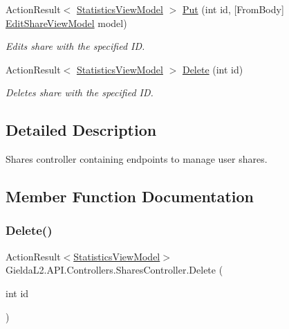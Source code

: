 \begin{DoxyCompactItemize}
Action\+Result$<$ \mbox{\hyperlink{class_gielda_l2_1_1_a_p_i_1_1_view_models_1_1_view_1_1_statistics_view_model}{Statistics\+View\+Model}} $>$ \mbox{\hyperlink{class_gielda_l2_1_1_a_p_i_1_1_controllers_1_1_shares_controller_a348aaaccd93f56ec312cd4b3e7e3d7d0}{Put}} (int id, \mbox{[}From\+Body\mbox{]} \mbox{\hyperlink{class_gielda_l2_1_1_a_p_i_1_1_view_models_1_1_edit_1_1_edit_share_view_model}{Edit\+Share\+View\+Model}} model)
\begin{DoxyCompactList}\small\item\em Edits share with the specified ID. \end{DoxyCompactList}\item 
Action\+Result$<$ \mbox{\hyperlink{class_gielda_l2_1_1_a_p_i_1_1_view_models_1_1_view_1_1_statistics_view_model}{Statistics\+View\+Model}} $>$ \mbox{\hyperlink{class_gielda_l2_1_1_a_p_i_1_1_controllers_1_1_shares_controller_ad322516136277b4893790a697442ac72}{Delete}} (int id)
\begin{DoxyCompactList}\small\item\em Deletes share with the specified ID. \end{DoxyCompactList}\end{DoxyCompactItemize}


\subsection{Detailed Description}
Shares controller containing endpoints to manage user shares. 



\subsection{Member Function Documentation}
\mbox{\label{class_gielda_l2_1_1_a_p_i_1_1_controllers_1_1_shares_controller_ad322516136277b4893790a697442ac72}} 
\subsubsection{\texorpdfstring{Delete()}{Delete()}}
{\footnotesize\ttfamily Action\+Result$<$\mbox{\hyperlink{class_gielda_l2_1_1_a_p_i_1_1_view_models_1_1_view_1_1_statistics_view_model}{Statistics\+View\+Model}}$>$ Gielda\+L2.\+A\+P\+I.\+Controllers.\+Shares\+Controller.\+Delete (\begin{DoxyParamCaption}\item[{int}]{id }\end{DoxyParamCaption})}



